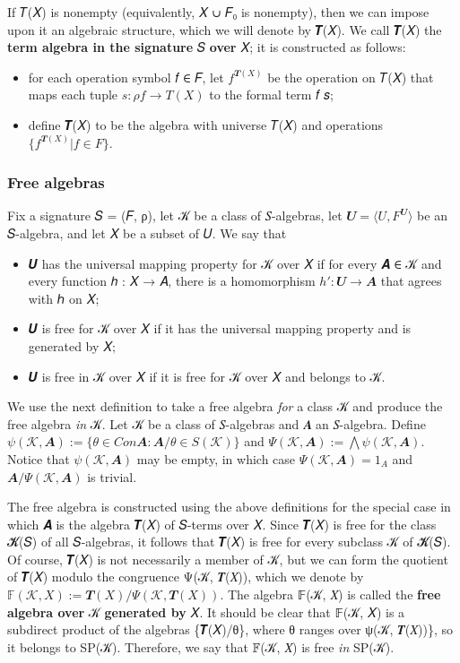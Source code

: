 \documentclass[sigplan,screen]{acmart}
\begin{document}
If 𝑇(𝑋) is nonempty (equivalently, 𝑋 ∪ 𝐹₀ is nonempty), then we can impose upon it an algebraic structure, which we will denote by 𝑻(𝑋). We call 𝑻(𝑋) the \textbf{term algebra in the signature} 𝑆 \textbf{over} 𝑋; it is constructed as follows:
\begin{itemize}
\item for each operation symbol 𝑓 ∈ 𝐹, let \(f^{𝑻(X)}\) be the operation on 𝑇(𝑋) that maps each tuple \(𝑠 : ρ𝑓 → 𝑇(𝑋)\) to the formal term 𝑓 𝑠;
\item define 𝑻(𝑋) to be the algebra with universe 𝑇(𝑋) and operations \(\{f^{𝑻(X)} | f ∈ F\}\).
\end{itemize}

\subsubsection{Free algebras}\label{free-algebras}
Fix a signature 𝑆 = (𝐹, ρ), let 𝒦 be a class of 𝑆-algebras, let \(𝑼 = ⟨𝑈, 𝐹^{𝑼}⟩\) be an 𝑆-algebra, and let 𝑋 be a subset of 𝑈. We say that
\begin{itemize}
\item 𝑼 has the universal mapping property for 𝒦 over 𝑋 if for every 𝑨 ∈ 𝒦 and every function ℎ : 𝑋 → 𝐴, there is a homomorphism \(h' : 𝑼 → 𝑨\) that agrees with ℎ on 𝑋;
\item 𝑼 is free for 𝒦 over 𝑋 if it has the universal mapping property and is generated by 𝑋;
\item 𝑼 is free in 𝒦 over 𝑋 if it is free for 𝒦 over 𝑋 and belongs to 𝒦.
\end{itemize}
We use the next definition to take a free algebra \emph{for} a class 𝒦 and produce the free algebra \emph{in} 𝒦. Let 𝒦 be a class of 𝑆-algebras and 𝑨 an 𝑆-algebra. Define \(ψ(𝒦, 𝑨) := \{θ ∈ Con 𝑨 : 𝑨/θ ∈ S(𝒦)\}\) and \(Ψ(𝒦, 𝑨) := ⋀ ψ(𝒦, 𝑨)\). Notice that \(ψ(𝒦, 𝑨)\) may be empty, in which case \(Ψ(𝒦, 𝑨) = 1_A\) and \(𝑨/Ψ(𝒦, 𝑨)\) is trivial.

The free algebra is constructed using the above definitions for the special case in which 𝑨 is the algebra 𝑻(𝑋) of 𝑆-terms over 𝑋. Since 𝑻(𝑋) is free for the class 𝓚(𝑆) of all 𝑆-algebras, it follows that 𝑻(𝑋) is free for every subclass 𝒦 of 𝓚(𝑆). Of course, 𝑻(𝑋) is not necessarily a member of 𝒦, but we can form the quotient of 𝑻(𝑋) modulo the congruence Ψ(𝒦, 𝑻(𝑋)), which we denote by \(𝔽(𝒦, 𝑋) := 𝑻(𝑋)/Ψ(𝒦, 𝑻(𝑋))\). The algebra 𝔽(𝒦, 𝑋) is called the \textbf{free algebra over} 𝒦 \textbf{generated by} 𝑋. It should be clear that 𝔽(𝒦, 𝑋) is a subdirect product of the algebras \{𝑻(𝑋)/θ\}, where θ ranges over ψ(𝒦, 𝑻(𝑋))\}, so it belongs to SP(𝒦). Therefore, we say that 𝔽(𝒦, 𝑋) is free \emph{in} SP(𝒦).
\end{document}
